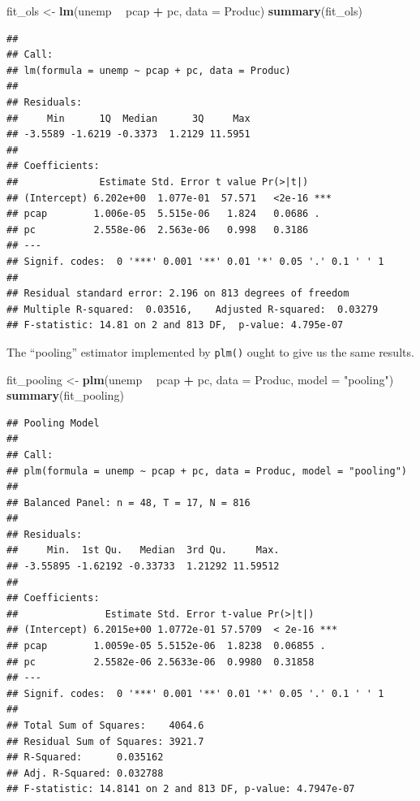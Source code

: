 \documentclass[12pt,oneside,openany]{book}
\newenvironment{Shaded}{\begin{snugshade}}{\end{snugshade}}
\newcommand{\KeywordTok}[1]{\textcolor[rgb]{0.13,0.29,0.53}{\textbf{#1}}}
\newcommand{\DataTypeTok}[1]{\textcolor[rgb]{0.13,0.29,0.53}{#1}}
\newcommand{\StringTok}[1]{\textcolor[rgb]{0.31,0.60,0.02}{#1}}
\newcommand{\OperatorTok}[1]{\textcolor[rgb]{0.81,0.36,0.00}{\textbf{#1}}}
\newcommand{\NormalTok}[1]{#1}
\begin{document}
\begin{Shaded}
\begin{Highlighting}[]
\NormalTok{fit_ols <-}\StringTok{ }\KeywordTok{lm}\NormalTok{(unemp }\OperatorTok{~}\StringTok{ }\NormalTok{pcap }\OperatorTok{+}\StringTok{ }\NormalTok{pc,}
              \DataTypeTok{data =}\NormalTok{ Produc)}
\KeywordTok{summary}\NormalTok{(fit_ols)}
\end{Highlighting}
\end{Shaded}

\begin{verbatim}
## 
## Call:
## lm(formula = unemp ~ pcap + pc, data = Produc)
## 
## Residuals:
##     Min      1Q  Median      3Q     Max 
## -3.5589 -1.6219 -0.3373  1.2129 11.5951 
## 
## Coefficients:
##              Estimate Std. Error t value Pr(>|t|)    
## (Intercept) 6.202e+00  1.077e-01  57.571   <2e-16 ***
## pcap        1.006e-05  5.515e-06   1.824   0.0686 .  
## pc          2.558e-06  2.563e-06   0.998   0.3186    
## ---
## Signif. codes:  0 '***' 0.001 '**' 0.01 '*' 0.05 '.' 0.1 ' ' 1
## 
## Residual standard error: 2.196 on 813 degrees of freedom
## Multiple R-squared:  0.03516,    Adjusted R-squared:  0.03279 
## F-statistic: 14.81 on 2 and 813 DF,  p-value: 4.795e-07
\end{verbatim}

The ``pooling'' estimator implemented by \texttt{plm()} ought to give us
the same results.

\begin{Shaded}
\begin{Highlighting}[]
\NormalTok{fit_pooling <-}\StringTok{ }\KeywordTok{plm}\NormalTok{(unemp }\OperatorTok{~}\StringTok{ }\NormalTok{pcap }\OperatorTok{+}\StringTok{ }\NormalTok{pc,}
                   \DataTypeTok{data =}\NormalTok{ Produc,}
                   \DataTypeTok{model =} \StringTok{"pooling"}\NormalTok{)}
\KeywordTok{summary}\NormalTok{(fit_pooling)}
\end{Highlighting}
\end{Shaded}

\begin{verbatim}
## Pooling Model
## 
## Call:
## plm(formula = unemp ~ pcap + pc, data = Produc, model = "pooling")
## 
## Balanced Panel: n = 48, T = 17, N = 816
## 
## Residuals:
##     Min.  1st Qu.   Median  3rd Qu.     Max. 
## -3.55895 -1.62192 -0.33733  1.21292 11.59512 
## 
## Coefficients:
##               Estimate Std. Error t-value Pr(>|t|)    
## (Intercept) 6.2015e+00 1.0772e-01 57.5709  < 2e-16 ***
## pcap        1.0059e-05 5.5152e-06  1.8238  0.06855 .  
## pc          2.5582e-06 2.5633e-06  0.9980  0.31858    
## ---
## Signif. codes:  0 '***' 0.001 '**' 0.01 '*' 0.05 '.' 0.1 ' ' 1
## 
## Total Sum of Squares:    4064.6
## Residual Sum of Squares: 3921.7
## R-Squared:      0.035162
## Adj. R-Squared: 0.032788
## F-statistic: 14.8141 on 2 and 813 DF, p-value: 4.7947e-07
\end{verbatim}
\end{document}
